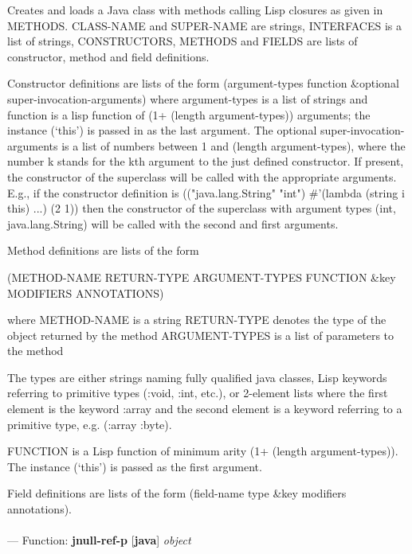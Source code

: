\begin{adjustwidth}{5em}{5em}
Creates and loads a Java class with methods calling Lisp closures
   as given in METHODS.  CLASS-NAME and SUPER-NAME are strings,
   INTERFACES is a list of strings, CONSTRUCTORS, METHODS and FIELDS are
   lists of constructor, method and field definitions.

   Constructor definitions are lists of the form
   (argument-types function \&optional super-invocation-arguments)
   where argument-types is a list of strings and function is a lisp function of
   (1+ (length argument-types)) arguments; the instance (`this') is passed in as
   the last argument. The optional super-invocation-arguments is a list of numbers
   between 1 and (length argument-types), where the number k stands for the kth argument
   to the just defined constructor. If present, the constructor of the superclass
   will be called with the appropriate arguments. E.g., if the constructor definition is
   (("java.lang.String" "int") \#'(lambda (string i this) ...) (2 1))
   then the constructor of the superclass with argument types (int, java.lang.String) will
   be called with the second and first arguments.

   Method definitions are lists of the form

     (METHOD-NAME RETURN-TYPE ARGUMENT-TYPES FUNCTION \&key MODIFIERS ANNOTATIONS)

   where
      METHOD-NAME is a string
      RETURN-TYPE denotes the type of the object returned by the method
      ARGUMENT-TYPES is a list of parameters to the method

        The types are either strings naming fully qualified java classes, Lisp
        keywords referring to primitive types (:void, :int, etc.), or 2-element
        lists where the first element is the keyword :array and the second
        element is a keyword referring to a primitive type, e.g. (:array :byte).

     FUNCTION is a Lisp function of minimum arity (1+ (length
     argument-types)). The instance (`this') is passed as the first
     argument.

   Field definitions are lists of the form (field-name type \&key modifiers annotations).
\end{adjustwidth}

\paragraph{}
\label{JAVA:JNULL-REF-P}
--- Function: \textbf{jnull-ref-p} [\textbf{java}] \textit{object}

